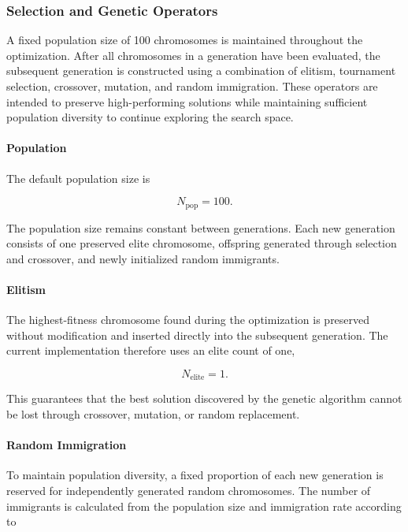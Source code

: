 \documentclass[11pt]{article}
\begin{document}
\subsubsection{Selection and Genetic Operators}

A fixed population size of 100 chromosomes is maintained throughout the optimization. After all chromosomes in a generation have been evaluated, the subsequent generation is constructed using a combination of elitism, tournament selection, crossover, mutation, and random immigration. These operators are intended to preserve high-performing solutions while maintaining sufficient population diversity to continue exploring the search space.

\paragraph{Population}

The default population size is

\begin{equation}
    N_{\mathrm{pop}} = 100.
\end{equation}

The population size remains constant between generations. Each new generation consists of one preserved elite chromosome, offspring generated through selection and crossover, and newly initialized random immigrants. 
\paragraph{Elitism}

The highest-fitness chromosome found during the optimization is preserved without modification and inserted directly into the subsequent generation. The current implementation therefore uses an elite count of one, 

\begin{equation}
    N_{\mathrm{elite}} = 1.
\end{equation}

This guarantees that the best solution discovered by the genetic algorithm cannot be lost through crossover, mutation, or random replacement. 
\paragraph{Random Immigration}

To maintain population diversity, a fixed proportion of each new generation is reserved for independently generated random chromosomes. The number of immigrants is calculated from the population size and immigration rate according to
\end{document}
